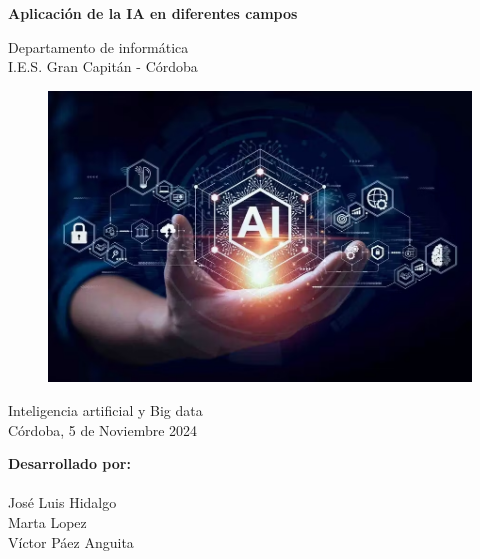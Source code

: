 \documentclass[12pt]{article}
\begin{document}
\begin{titlepage}
    \begin{center}
      \Large \bfseries{}
    \end{center}
    \vspace{0.1cm}
    \begin{center}
      \Large \bfseries{}
    \end{center}
    \vspace{0.1cm}
    \begin{center}
     \Large \bfseries{Aplicación de la IA en diferentes campos}
    \end{center}
    \vspace{0.0001cm}
    \begin{center}
        Departamento de informática \\ I.E.S. Gran Capitán - Córdoba
    \end{center}
        \vspace{2 cm}
\begin{figure}[h!]
    \centering
    \includegraphics[width=.6\textwidth]{ramas_ia_1.jpg}
    \label{fig:my_label}
\end{figure}
    \vspace{0.2 cm}
    \begin{center}
        Inteligencia artificial y Big data \\ Córdoba, 5 de Noviembre 2024
    \end{center}
    \vspace{4 cm}
\null\hfill \textbf{Desarrollado por:}
\\
\\
\null\hfill José Luis Hidalgo
\\
\null\hfill Marta Lopez
\\
\null\hfill Víctor Páez Anguita
\clearpage
\end{titlepage}

\tableofcontents
\clearpage
\end{document}
